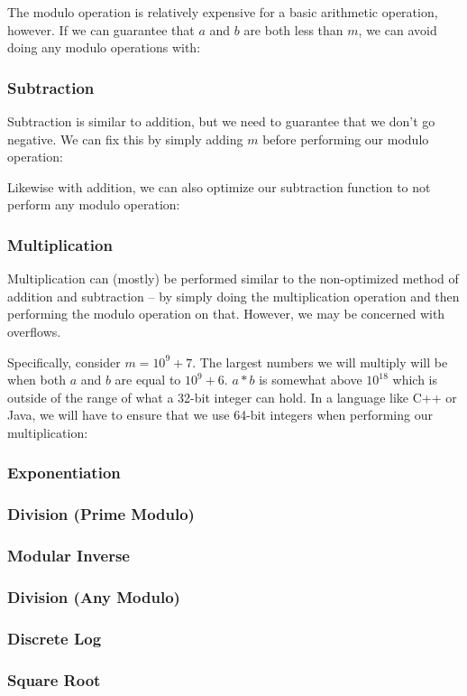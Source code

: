 
The modulo operation is relatively expensive for a basic arithmetic operation, however. If we can guarantee that $a$ and $b$ are both less than $m$, we can avoid doing any modulo operations with:


\subsubsection{Subtraction}

Subtraction is similar to addition, but we need to guarantee that we don't go negative. We can fix this by simply adding $m$ before performing our modulo operation:


Likewise with addition, we can also optimize our subtraction function to not perform any modulo operation:


\subsubsection{Multiplication}

Multiplication can (mostly) be performed similar to the non-optimized method of addition and subtraction -- by simply doing the multiplication operation and then performing the modulo operation on that. However, we may be concerned with overflows.

Specifically, consider $m = 10^9 + 7$. The largest numbers we will multiply will be when both $a$ and $b$ are equal to $10^9 + 6$. $a * b$ is somewhat above $10^{18}$ which is outside of the range of what a 32-bit integer can hold. In a language like C++ or Java, we will have to ensure that we use 64-bit integers when performing our multiplication:


\subsubsection{Exponentiation}

\subsubsection{Division (Prime Modulo)}

\subsubsection{Modular Inverse}

\subsubsection{Division (Any Modulo)}

\subsubsection{Discrete Log}

\subsubsection{Square Root}
